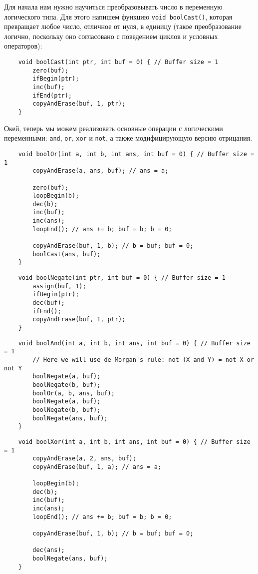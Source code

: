 \documentclass{book}
\begin{document}
Для начала нам нужно научиться преобразовывать число в переменную логического типа. Для этого напишем функцию \texttt{void boolCast()},
которая превращает любое число, отличное от нуля, в единицу (такое преобразование логично, поскольку оно согласовано с поведением
циклов и условных операторов):

\begin{verbatim}
    void boolCast(int ptr, int buf = 0) { // Buffer size = 1
        zero(buf);
        ifBegin(ptr);
        inc(buf);
        ifEnd(ptr);
        copyAndErase(buf, 1, ptr);
    }
\end{verbatim}

Окей, теперь мы можем реализовать основные операции с логическими переменными: \texttt{and}, \texttt{or}, \texttt{xor} и \texttt{not},
а также модифицирующую версию отрицания.
 
\begin{verbatim}
    void boolOr(int a, int b, int ans, int buf = 0) { // Buffer size = 1
        copyAndErase(a, ans, buf); // ans = a;
        
        zero(buf);
        loopBegin(b);
        dec(b);
        inc(buf);
        inc(ans);
        loopEnd(); // ans += b; buf = b; b = 0;

        copyAndErase(buf, 1, b); // b = buf; buf = 0;
        boolCast(ans, buf);
    }
\end{verbatim}

\begin{verbatim}
    void boolNegate(int ptr, int buf = 0) { // Buffer size = 1
        assign(buf, 1);
        ifBegin(ptr);
        dec(buf);
        ifEnd();
        copyAndErase(buf, 1, ptr);
    }
\end{verbatim}

\begin{verbatim}
    void boolAnd(int a, int b, int ans, int buf = 0) { // Buffer size = 1
        // Here we will use de Morgan's rule: not (X and Y) = not X or not Y
        boolNegate(a, buf);
        boolNegate(b, buf);
        boolOr(a, b, ans, buf);
        boolNegate(a, buf);
        boolNegate(b, buf);
        boolNegate(ans, buf);
    }
\end{verbatim}

\begin{verbatim}
    void boolXor(int a, int b, int ans, int buf = 0) { // Buffer size = 1
        copyAndErase(a, 2, ans, buf);
        copyAndErase(buf, 1, a); // ans = a;
        
        loopBegin(b);
        dec(b);
        inc(buf);
        inc(ans);
        loopEnd(); // ans += b; buf = b; b = 0;

        copyAndErase(buf, 1, b); // b = buf; buf = 0;
        
        dec(ans);
        boolNegate(ans, buf);
    }
\end{verbatim}
\end{document}

